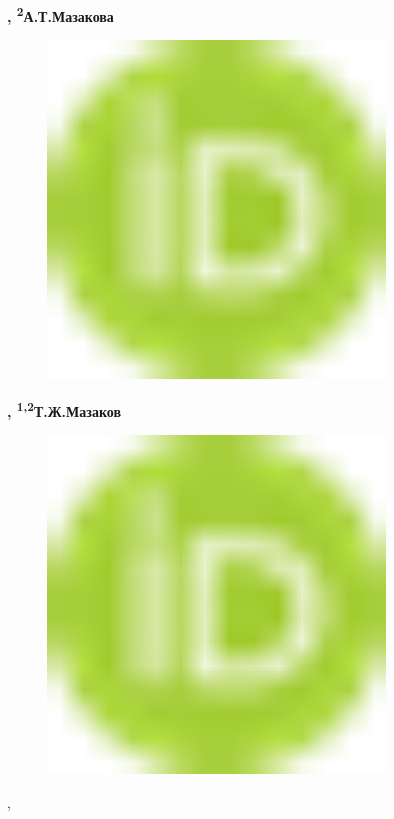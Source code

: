 {\bfseries \textsuperscript{\envelope },
\textsuperscript{2}А.Т.Мазакова}
\begin{figure}[H]
	\centering
	\includegraphics[width=0.8\textwidth]{media/ict/image16}
	\caption*{}
\end{figure}
{\bfseries ,
\textsuperscript{1,2}Т.Ж.Мазаков}
\begin{figure}[H]
	\centering
	\includegraphics[width=0.8\textwidth]{media/ict/image16}
	\caption*{}
\end{figure}
,

